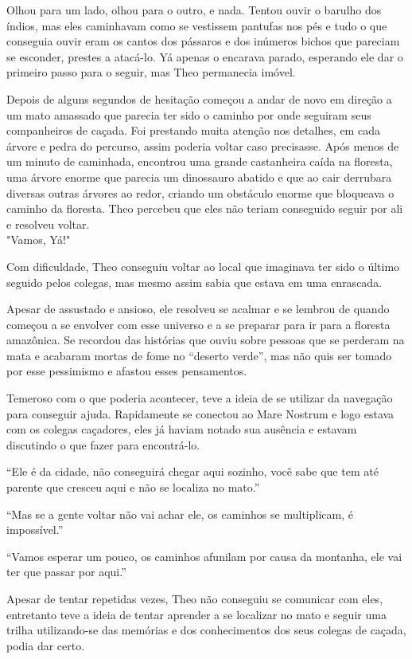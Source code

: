 Olhou para um lado, olhou para o outro, e nada. Tentou ouvir o barulho
dos índios, mas eles caminhavam como se vestissem pantufas nos pés e
tudo o que conseguia ouvir eram os cantos dos pássaros e dos inúmeros
bichos que pareciam se esconder, prestes a atacá-lo. Yá apenas o
encarava parado, esperando ele dar o primeiro passo para o seguir, mas
Theo permanecia imóvel.

Depois de alguns segundos de hesitação começou a andar de novo em
direção a um mato amassado que parecia ter sido o caminho por onde
seguiram seus companheiros de caçada. Foi prestando muita atenção nos
detalhes, em cada árvore e pedra do percurso, assim poderia voltar caso
precisasse. Após menos de um minuto de caminhada, encontrou uma grande
castanheira caída na floresta, uma árvore enorme que parecia um
dinossauro abatido e que ao cair derrubara diversas outras árvores ao
redor, criando um obstáculo enorme que bloqueava o caminho da floresta.
Theo percebeu que eles não teriam conseguido seguir por ali e resolveu
voltar.\\
"Vamos, Yá!"

Com dificuldade, Theo conseguiu voltar ao local que imaginava ter sido o
último seguido pelos colegas, mas mesmo assim sabia que estava em uma
enrascada.

Apesar de assustado e ansioso, ele resolveu se acalmar e se lembrou de
quando começou a se envolver com esse universo e a se preparar para ir
para a floresta amazônica. Se recordou das histórias que ouviu sobre
pessoas que se perderam na mata e acabaram mortas de fome no ``deserto
verde'', mas não quis ser tomado por esse pessimismo e afastou esses
pensamentos.

Temeroso com o que poderia acontecer, teve a ideia de se utilizar da
navegação para conseguir ajuda. Rapidamente se conectou ao Mare Nostrum
e logo estava com os colegas caçadores, eles já haviam notado sua
ausência e estavam discutindo o que fazer para encontrá-lo.

``Ele é da cidade, não conseguirá chegar aqui sozinho, você sabe que tem
até parente que cresceu aqui e não se localiza no mato.''

``Mas se a gente voltar não vai achar ele, os caminhos se multiplicam, é
impossível.''

``Vamos esperar um pouco, os caminhos afunilam por causa da montanha,
ele vai ter que passar por aqui.''

Apesar de tentar repetidas vezes, Theo não conseguiu se comunicar com
eles, entretanto teve a ideia de tentar aprender a se localizar no mato
e seguir uma trilha utilizando-se das memórias e dos conhecimentos dos
seus colegas de caçada, podia dar certo.

